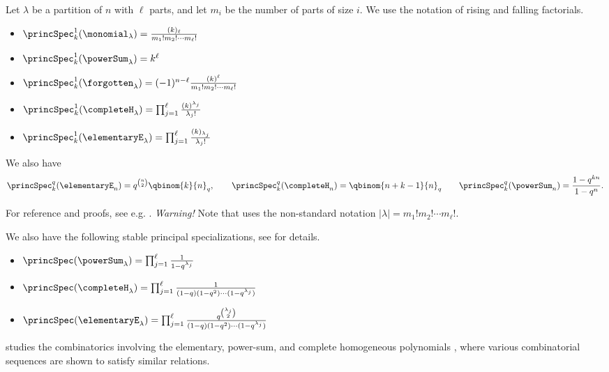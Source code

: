 Let $\lambda$ be a partition of $n$ with $\ell$ parts, and let $m_i$ be the
number of parts of size $i$.  We use the notation of rising and falling
factorials.
\begin{itemize}
\item
$\princSpec_k^1(\monomial_\lambda) = \frac{(k)_{\ell}}{m_1!m_2!\dotsm m_\ell!}$

\item
$\princSpec_k^1(\powerSum_\lambda) = k^{\ell}$

\item
$\princSpec_k^1(\forgotten_\lambda) = (-1)^{n-\ell}\frac{(k)^{\ell}}{m_1!m_2!\dotsm m_\ell!}$

\item
$\princSpec_k^1(\completeH_\lambda) = \prod_{j=1}^\ell \frac{(k)^{\lambda_j}}{\lambda_j!}$

\item
$\princSpec_k^1(\elementaryE_\lambda) = \prod_{j=1}^\ell \frac{(k)_{\lambda_j}}{\lambda_j!}$
\end{itemize}

We also have
\[
\princSpec_k^q( \elementaryE_n ) = q^{\binom{n}{2}} \qbinom{k}{n}_q, \qquad
\princSpec_k^q( \completeH_n )  =  \qbinom{n+k-1}{n}_q \qquad
\princSpec_k^q( \powerSum_n )  =  \frac{1-q^{kn}}{1-q^n}.
\]

For reference and proofs, see e.g. \cite{Rosas2002}.
\emph{Warning!} Note that  uses the non-standard notation
$|\lambda|=m_1!m_2!\dotsm m_\ell!$.

We also have the following stable principal specializations,
see \cite[p.~303]{StanleyEC2} for details.

\begin{itemize}
\item
$\princSpec(\powerSum_\lambda) = \prod_{j=1}^\ell \frac{1}{1-q^{\lambda_j}} $

\item
$\princSpec(\completeH_\lambda)
=
\prod_{j=1}^\ell \frac{1}{(1-q)(1-q^2)\dotsm (1-q^{\lambda_j})} $

\item
$\princSpec(\elementaryE_\lambda)
=
\prod_{j=1}^\ell
\frac{q^{\binom{\lambda_j}{2}}}{(1-q)(1-q^2)\dotsm (1-q^{\lambda_j})} $

\end{itemize}

 studies the combinatorics involving the elementary,
power-sum, and complete homogeneous polynomials \cite{OSullivan2022x}, where
various combinatorial sequences are shown to satisfy similar relations.


